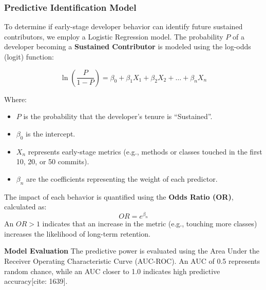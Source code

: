



\subsubsection*{Predictive Identification Model}
To determine if early-stage developer behavior can identify future sustained contributors, we employ a Logistic Regression model. The probability $P$ of a developer becoming a \textbf{Sustained Contributor} is modeled using the log-odds (logit) function:

\begin{equation}
    \ln\left(\frac{P}{1-P}\right) = \beta_0 + \beta_1 X_{1} + \beta_2 X_{2} + \dots + \beta_n X_{n}
\end{equation}

Where:
\begin{itemize}
    \item $P$ is the probability that the developer's tenure is ``Sustained''.
    \item $\beta_0$ is the intercept.
    \item $X_n$ represents early-stage metrics (e.g., methods or classes touched in the first 10, 20, or 50 commits).
    \item $\beta_n$ are the coefficients representing the weight of each predictor.
\end{itemize}

The impact of each behavior is quantified using the \textbf{Odds Ratio (OR)}, calculated as:
\begin{equation}
    OR = e^{\beta_n}
\end{equation}
An $OR > 1$ indicates that an increase in the metric (e.g., touching more classes) increases the likelihood of long-term retention. 

\textbf{Model Evaluation}
The predictive power is evaluated using the Area Under the Receiver Operating Characteristic Curve (AUC-ROC). An AUC of 0.5 represents random chance, while an AUC closer to 1.0 indicates high predictive accuracy[cite: 1639].

 \newpage 
